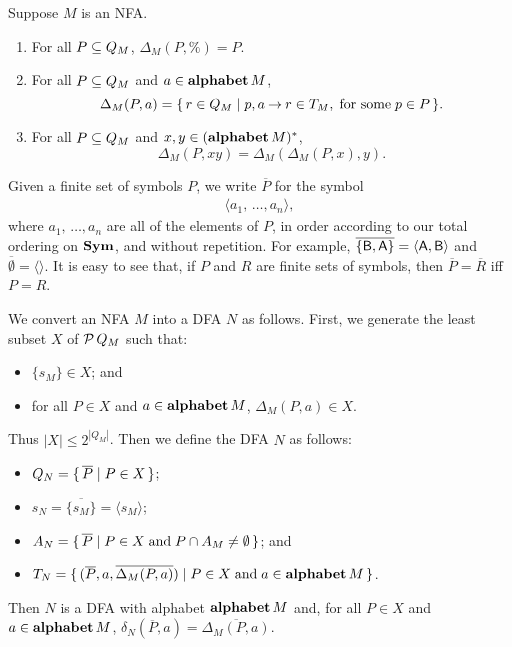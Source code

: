 \begin{proposition}
\label{NFADeltaProp}
Suppose $M$ is an NFA.
\begin{enumerate}[\quad(1)]
\item For all $P\subseteq Q_M$, $\Delta_M(P,\%)=P$.

\item For all $P\subseteq Q_M$ and $a\in\mathbf{alphabet}\,M$,
  \begin{displaymath}
    \Delta_M(P,a)=\{ \, r\in Q_M \mid p,a\mathbin{\to} r\in T_M,\;\allowbreak\mbox{for some}\allowbreak\;p\in P \, \}.
  \end{displaymath}

\item For all $P\subseteq Q_M$ and $x,y\in(\mathbf{alphabet}\,M)^*$,
  \begin{displaymath}
    \Delta_M(P, xy)=\Delta_M(\Delta_M(P,x),y) .
  \end{displaymath}
\end{enumerate}
\end{proposition}

Given a finite set of symbols $P$, we write $\overline{P}$ for
the symbol
\begin{gather*}
\langle a_1,\,\ldots,a_n\rangle,
\end{gather*}
where $a_1,\,\ldots,a_n$ are all of the elements of $P$, in order
according to our total ordering on $\mathbf{Sym}$, and without repetition.  For
example, $\overline{\{\mathsf{B},\mathsf{A}\}}=\langle\mathsf{A},\mathsf{B}\rangle$ and
$\overline{\emptyset}=\langle\rangle$.
It is easy to see that, if $P$ and $R$ are finite sets of symbols, then
$\overline{P}=\overline{R}$ iff $P=R$.

We convert an NFA $M$ into a DFA $N$ as follows.  First,
we generate the least subset $X$ of ${\cal P} \,Q_M$ such that:
\begin{itemize}
\item $\{s_M\}\in X$; and

\item for all $P\in X$ and $a\in\mathbf{alphabet}\,M$,
$\Delta_M(P,a)\in X$.
\end{itemize}
Thus $|X|\leq 2^{|Q_M|}$.  Then we define the DFA $N$ as follows:
\begin{itemize}
\item $Q_N=\{ \, \overline{P} \mid P\in X \, \}$;

\item $s_N=\overline{\{s_M\}}=\langle s_M\rangle$;

\item $A_N=\{ \, \overline{P} \mid P\in X\;\allowbreak\mbox{and}\allowbreak\;P\cap A_M\neq\emptyset \, \}$;
  and

\item $T_N=\{ \, (\overline{P},a,
\overline{\Delta_M(P,a)}) \mid P\in X\;\allowbreak\mbox{and}\allowbreak\;a\in\mathbf{alphabet}\,M \, \}$.
\end{itemize}
Then $N$ is a DFA with alphabet $\mathbf{alphabet}\,M$ and, for all $P\in X$ and
$a\in\mathbf{alphabet}\,M$, $\delta_N(\overline{P},a)=\overline{\Delta_M(P,a)}$.

